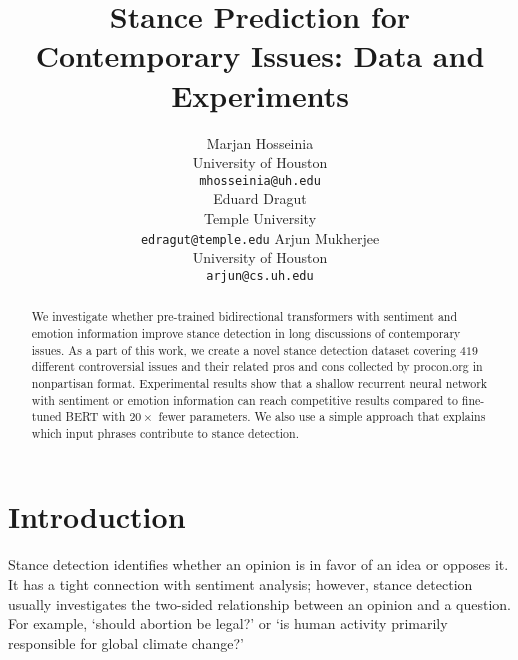 \documentclass[11pt,a4paper]{article}
\title{Stance Prediction for Contemporary Issues: Data and Experiments}
\author{ Marjan Hosseinia \\
University of Houston\\
\texttt{mhosseinia@uh.edu} \\ \And
Eduard Dragut\\
Temple University\\
\texttt{edragut@temple.edu} \And
Arjun Mukherjee \\
University of Houston \\
\texttt{arjun@cs.uh.edu}\\
}
\date{}
\begin{document}
\maketitle
\begin{abstract}
We investigate whether pre-trained bidirectional transformers with sentiment and emotion information improve stance detection in long discussions of contemporary issues.  As a part of this work, we create a novel stance detection dataset covering $419$ different controversial issues and their related pros and cons collected by procon.org in nonpartisan format. Experimental results show that a shallow recurrent neural network with sentiment or emotion information can reach competitive results compared to fine-tuned BERT with $20\times$ fewer parameters. We also use a simple approach that explains which input phrases contribute to stance detection. 
\end{abstract}

\section{Introduction}

Stance detection identifies whether an opinion is in favor of an idea or opposes it. It has a tight connection with sentiment analysis; however, stance detection usually investigates the two-sided relationship between an opinion and a question. For example, `should abortion be legal?' or `is human activity primarily responsible for global climate change?'

\end{document}
